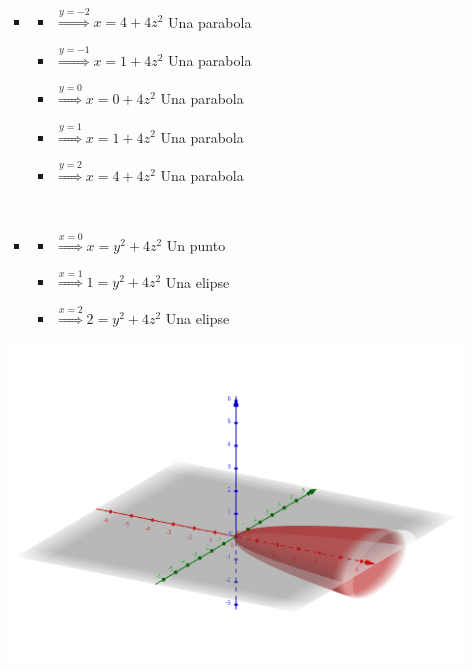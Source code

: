 \documentclass[../practica_02.tex]{subfiles}
\begin{document}
\begin{enumerate}
\begin{enumerate}
\begin{itemize}
                            $ $

                        \item
                            \begin{itemize}
                                \item $\stackrel{y=-2}{\Rightarrow} x = 4 + 4z^2 $ Una parabola
                                \item $\stackrel{y=-1}{\Rightarrow} x = 1 + 4z^2 $ Una parabola
                                \item $\stackrel{y=0}{\Rightarrow} x = 0 + 4z^2 $ Una parabola
                                \item $\stackrel{y=1}{\Rightarrow} x = 1 + 4z^2 $ Una parabola
                                \item $\stackrel{y=2}{\Rightarrow} x = 4 + 4z^2 $ Una parabola
                            \end{itemize}

                            $ $

                        \item
                            \begin{itemize}
                                \item $\stackrel{x=0}{\Rightarrow}  x = y^2 + 4z^2 $ Un punto
                                \item $\stackrel{x=1}{\Rightarrow}  1 = y^2 + 4z^2 $ Una elipse
                                \item $\stackrel{x=2}{\Rightarrow}  2 = y^2 + 4z^2 $ Una elipse
                            \end{itemize}

                    \end{itemize}

                    \includegraphics[scale=0.4]{ej07/resources/1c.png} $ $


\end{enumerate}
\end{enumerate}
\end{document}
